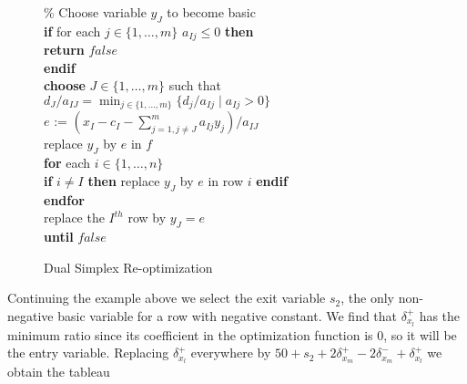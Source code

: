 \documentclass{article}
\begin{document}
\begin{figure}[tb]
\begin{center}
{\begin{minipage}{10cm}
\begin{tabbing}
\> \> \% Choose variable $y_J$ to become basic\\
\> \> \textbf{if} for each $j \in \{ 1, \ldots , m\}$ $a_{Ij} \leq 0$ \textbf{then} \\
\> \> \> \textbf{return} $false$\\
\> \> \textbf{endif} \\
\> \> \textbf{choose} $J \in \{1, \ldots , m\}$ such that\\
\> \> \> $d_J / a_{IJ} =
    \min_{j \in \{1, \ldots , m\}} \{ d_j / a_{Ij} \mid a_{Ij} > 0 \}$\\
\> \> $e$ := $( x_I - c_I - \sum_{j=1, j\ne J}^m a_{Ij} y_j)/ a_{IJ}$\\
\> \> replace $y_J$ by $e$ in $f$\\
\> \> \textbf{for} each $i \in \{1, \ldots ,n\}$\\
\> \> \> \textbf{if} $i \ne I$ \textbf{then}
       replace $y_J$ by $e$ in row $i$ \textbf{endif}\\
\> \> \textbf{endfor}\\
\> \> replace the $I^{th}$ row by $y_J = e$ \\
\> \textbf{until} $false$ \\
\end{tabbing}
\end{minipage}
}
\end{center}
\caption{Dual Simplex Re-optimization\label{fig:simplex-dual}}
\end{figure}

Continuing the example above
we select the exit variable $s_2$, 
the only non-negative basic variable for a row with negative constant.  
We find that $\delta_{x_l}^+$
has the minimum ratio since its coefficient in the optimization function
is 0, so it will be the entry variable.
Replacing $\delta_{x_l}^+$ everywhere by 
$50 + s_2 + 2 \delta_{x_m}^+ - 2 \delta_{x_m}^- + \delta_{x_l}^+$
we obtain the tableau
\end{document}
